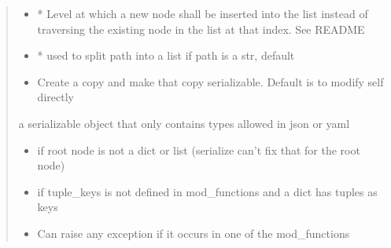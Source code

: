 \documentclass[a4paper,10pt,english]{sphinxmanual}
\begin{document}
\begin{fulllineitems}
\begin{fulllineitems}
\begin{quote}
\begin{description}
\begin{itemize}
\item {}
\sphinxAtStartPar
{} \textendash{} * Level at which a new node shall be inserted into the list instead of traversing the
existing node in the list at that index. See README

\item {}
\sphinxAtStartPar
{} \textendash{} * used to split path into a list if path is a str, default 

\item {}
\sphinxAtStartPar
{} \textendash{} Create a copy and make that copy serializable. Default is to modify self directly

\end{itemize}

\sphinxAtStartPar
a serializable object that only contains types allowed in json or yaml

\begin{itemize}
\item {}
\sphinxAtStartPar
{} \textendash{} if root node is not a dict or list (serialize can’t fix that for the root node)

\item {}
\sphinxAtStartPar
{} \textendash{} if tuple\_keys is not defined in mod\_functions and a dict has tuples as keys

\item {}
\sphinxAtStartPar
{} \textendash{} Can raise any exception if it occurs in one of the mod\_functions

\end{itemize}

\end{description}\end{quote}

\end{fulllineitems}



\end{fulllineitems}
\end{document}
